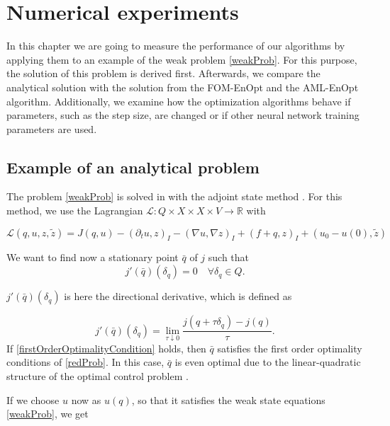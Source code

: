 \chapter{\label{chapterNumericalExperiments}Numerical experiments}

In this chapter we are going to measure the performance of our algorithms by applying them to an example of the weak problem \eqref{weakProb}. For this purpose, the solution of this problem is derived first. Afterwards, we compare the analytical solution with the solution from the FOM-EnOpt and the AML-EnOpt algorithm. Additionally, we examine how the optimization algorithms behave if parameters, such as the step size, are changed or if other neural network training parameters are used.

\section{Example of an analytical problem}

The problem \eqref{weakProb} is solved in \cite{doi:10.1137/070694016} with the adjoint state method \cite{Plessix2006ARO,Becker2007}. For this method, we use the Lagrangian $\mathcal{L}:Q\times X\times X \times V\to\mathbb{R}$ with

\begin{equation}
\label{lagrangian}
\mathcal{L}(q,u,z,\tilde{z})=J(q,u)-(\partial_tu,z)_I-(\nabla u, \nabla z)_I+(f+q, z)_I + (u_0-u(0), \tilde{z})
\end{equation}

We want to find now a stationary point $\bar{q}$ of $j$ such that
\begin{equation}
\label{firstOrderOptimalityCondition}
j'(\bar{q})(\delta_q)=0\quad\forall \delta_q\in Q.
\end{equation}

$j'(\bar{q})(\delta_q)$ is here the directional derivative, which is defined as

\begin{displaymath}
j'(\bar{q})(\delta_q)=\lim_{\tau\downarrow0}\frac{j(q+\tau\delta_q)-j(q)}{\tau}.
\end{displaymath}
If \eqref{firstOrderOptimalityCondition} holds, then $\bar{q}$ satisfies the first order optimality conditions of \eqref{redProb}. In this case, $\bar{q}$ is even optimal due to the linear-quadratic structure of the optimal control problem \cite{doi:10.1137/070694016}.

If we choose $u$ now as $u(q)$, so that it satisfies the weak state equations \eqref{weakProb}, we get

